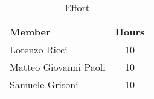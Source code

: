 \begin{table}[H]
    \centering
\begin{tabular}{|l|c|}
        \hline
        \textbf{Member} & \textbf{Hours} \\ \hline
        Lorenzo Ricci & 10 \\ \hline
        Matteo Giovanni Paoli & 10 \\ \hline
        Samuele Grisoni & 10 \\ \hline
    \end{tabular}
    \caption{Effort}
    \label{tab:effortricci}
\end{table}

